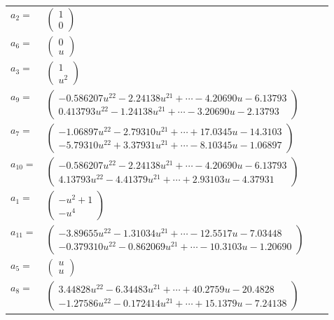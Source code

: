 \documentclass[1p]{elsarticle_modified}
\theoremstyle{definition}
\begin{document}
\begin{tabular}{m{7pt} m{180pt} m{7pt} m{180pt} }
\flushright $a_{2}=$&$\begin{pmatrix}1\\0\end{pmatrix}$ \\
\flushright $a_{6}=$&$\begin{pmatrix}0\\u\end{pmatrix}$ \\
\flushright $a_{3}=$&$\begin{pmatrix}1\\u^2\end{pmatrix}$ \\
\flushright $a_{9}=$&$\begin{pmatrix}-0.586207 u^{22}-2.24138 u^{21}+\cdots-4.20690 u-6.13793\\0.413793 u^{22}-1.24138 u^{21}+\cdots-3.20690 u-2.13793\end{pmatrix}$ \\
\flushright $a_{7}=$&$\begin{pmatrix}-1.06897 u^{22}-2.79310 u^{21}+\cdots+17.0345 u-14.3103\\-5.79310 u^{22}+3.37931 u^{21}+\cdots-8.10345 u-1.06897\end{pmatrix}$ \\
\flushright $a_{10}=$&$\begin{pmatrix}-0.586207 u^{22}-2.24138 u^{21}+\cdots-4.20690 u-6.13793\\4.13793 u^{22}-4.41379 u^{21}+\cdots+2.93103 u-4.37931\end{pmatrix}$ \\
\flushright $a_{1}=$&$\begin{pmatrix}- u^2+1\\- u^4\end{pmatrix}$ \\
\flushright $a_{11}=$&$\begin{pmatrix}-3.89655 u^{22}-1.31034 u^{21}+\cdots-12.5517 u-7.03448\\-0.379310 u^{22}-0.862069 u^{21}+\cdots-10.3103 u-1.20690\end{pmatrix}$ \\
\flushright $a_{5}=$&$\begin{pmatrix}u\\u\end{pmatrix}$ \\
\flushright $a_{8}=$&$\begin{pmatrix}3.44828 u^{22}-6.34483 u^{21}+\cdots+40.2759 u-20.4828\\-1.27586 u^{22}-0.172414 u^{21}+\cdots+15.1379 u-7.24138\end{pmatrix}$ \\

\end{tabular}
\end{document}
